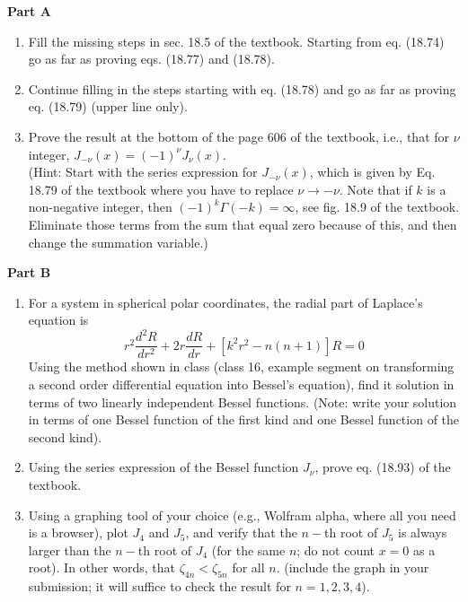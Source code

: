 \documentclass[fleqn]{article}
\begin{document}
  \textbf{Part A}
  \begin{enumerate}
    \item Fill the missing steps in sec. 18.5 of the textbook. Starting from eq. (18.74) go as far as proving eqs. (18.77) and (18.78).  


    \item Continue filling in the steps starting with eq. (18.78) and go as far as proving eq. (18.79) (upper line only). 
    
    
    \item Prove the result at the bottom of the page 606 of the textbook, i.e., that for $\nu$ integer, $J_{-\nu }(x)=(-1)^\nu J_{\nu }(x)$. \\
    (Hint: Start with the series expression for $J_{-\nu }(x)$, which is given by Eq. 18.79 of the textbook where you have to replace $\nu \rightarrow -\nu$. Note that if $k$ is a non-negative integer, then $(-1)^k \Gamma(-k) = \infty$, see fig. 18.9 of the textbook. Eliminate those terms from the sum that equal zero because of this, and then change the summation variable.)
    
  \end{enumerate}


  \textbf{Part B}
  \begin{enumerate}
    \item For a system in spherical polar coordinates, the radial part of Laplace's equation is
    $$r^2 \dfrac{d^2 R}{dr^2}+2r \dfrac{dR}{dr}+\left[k^2r^2-n(n+1)\right]R=0$$
    Using the method shown in class (class 16, example segment on transforming a second order differential equation into Bessel's equation), find it solution in terms of two linearly independent Bessel functions. (Note: write your solution in terms of one Bessel function of the first kind and one Bessel function of the second kind). 


    \item Using the series expression of the Bessel function $J_{\nu}$, prove eq. (18.93) of the textbook. 


    \item Using a graphing tool of your choice (e.g., Wolfram alpha, where all you need is a browser), plot $J_4$ and $J_5$, and verify that the $n-$th root of $J_5$ is always larger than the $n-$th root of $J_4$ (for the same $n$; do not count $x=0$ as a root).  In other words, that $\zeta_{4n}<\zeta_{5n}$ for all $n$. (include the graph in your submission; it will suffice to check the result for $n=1,2,3,4$). 


  \end{enumerate}
\end{document}
